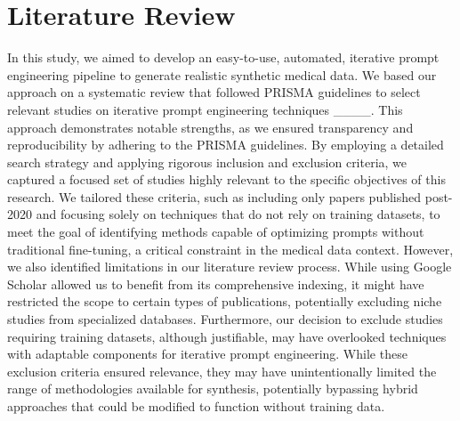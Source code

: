 \section{Literature Review}
In this study, we aimed to develop an easy-to-use, automated, iterative prompt engineering pipeline to generate realistic synthetic medical data. We based our approach on a systematic review that followed PRISMA guidelines to select relevant studies on iterative prompt engineering techniques ____. This approach demonstrates notable strengths, as we ensured transparency and reproducibility by adhering to the PRISMA guidelines. 
By employing a detailed search strategy and applying rigorous inclusion and exclusion criteria, we captured a focused set of studies highly relevant to the specific objectives of this research.
We tailored these criteria, such as including only papers published post-2020 and focusing solely on techniques that do not rely on training datasets, to meet the goal of identifying methods capable of optimizing prompts without traditional fine-tuning, a critical constraint in the medical data context.
However, we also identified limitations in our literature review process. While using Google Scholar allowed us to benefit from its comprehensive indexing, it might have restricted the scope to certain types of publications, potentially excluding niche studies from specialized databases. Furthermore, our decision to exclude studies requiring training datasets, although justifiable, may have overlooked techniques with adaptable components for iterative prompt engineering. While these exclusion criteria ensured relevance, they may have unintentionally limited the range of methodologies available for synthesis, potentially bypassing hybrid approaches that could be modified to function without training data.